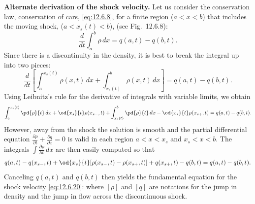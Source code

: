 \textbf{Alternate derivation of the shock velocity.}  Let us consider the conservation law, conservation of cars, \eqref{eq:12.6.8}, for a finite region ($a < x < b$) that includes the moving shock, ($a < x_s(t) < b$), (see Fig.~12.6.8):
\begin{equation}
\label{eq:12.6.21}
\frac{d}{d t}\int_a^b \rho\,dx = q(a,t) - q(b,t).
\end{equation}
Since there is a discontinuity in the density, it is best to break the integral up into two pieces:
\[
\frac{d}{d t}\left[\int_a^{x_s(t)} \rho(x,t)\,dx + \int_{x_s(t)}^b \rho(x,t)\,dx\right] = q(a,t) - q(b,t).
\]
Using Leibnitz's rule for the derivative of integrals with variable limits, we obtain
\[
\int_a^{x_s(t)}\pd{\rho}{t}\,dx + \od{x_s}{t}\rho(x_{s-},t) + \int_{x_s(t)}^b \pd{\rho}{t}\,dx - \od{x_s}{t}\rho(x_{s+},t) = q(a,t) - q(b,t).
\]
However, away from the shock the solution is smooth and the partial differential equation $\frac{\partial\rho}{\partial t} + \frac{\partial q}{\partial x} = 0$ is valid in each region $a < x < x_s$ and $x_s < x < b$.  The integrals $\int \frac{\partial\rho}{\partial t}\,dx$ are then easily computed so that
\[
q(a,t) - q(x_{s-},t) + \od{x_s}{t}[\rho(x_{s-},t) - \rho(x_{s+},t)] + q(x_{s+},t) - q(b,t) = q(a,t) - q(b,t).
\]
Canceling $q(a,t)$ and $q(b,t)$ then yields the fundamental equation for the shock velocity \eqref{eq:12.6.20}:
where $[\rho]$ and $[q]$ are notations for the jump in density and the jump in flow across the discontinuous shock.

